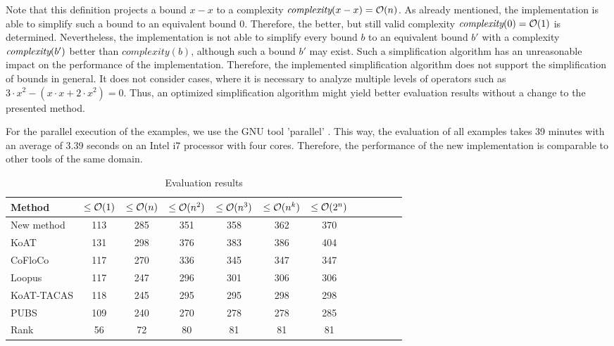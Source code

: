 

Note that this definition projects a bound $x-x$ to a complexity $\emph{complexity}(x-x) = \mathcal{O}(n)$.
As already mentioned, the implementation is able to simplify such a bound to an equivalent bound $0$.
Therefore, the better, but still valid complexity $\emph{complexity}(0) = \mathcal{O}(1)$ is determined.
Nevertheless, the implementation is not able to simplify every bound $b$ to an equivalent bound $b'$ with a complexity $\emph{complexity}(b')$ better than $complexity(b)$, although such a bound $b'$ may exist.
Such a simplification algorithm has an unreasonable impact on the performance of the implementation.
Therefore, the implemented simplification algorithm does not support the simplification of bounds in general.
It does not consider cases, where it is necessary to analyze multiple levels of operators such as $3 \cdot x^2-(x \cdot x+2 \cdot x^2) = 0$.
Thus, an optimized simplification algorithm might yield better evaluation results without a change to the presented method.

For the parallel execution of the examples, we use the GNU tool 'parallel' \cite{gnuparallel}.
This way, the evaluation of all examples takes 39 minutes with an average of 3.39 seconds on an Intel i7 processor with four cores.
Therefore, the performance of the new implementation is comparable to other tools of the same domain.

\begin{table}
  \begin{center}
    \label{tab:evaluation}
    \begin{tabular}{l|c|c|c|c|c|c|c|c|c|c|c}
      Method & $\leq\mathcal{O}(1)$ & $\leq\mathcal{O}(n)$ & $\leq\mathcal{O}(n^2)$ & $\leq\mathcal{O}(n^3)$ & $\leq\mathcal{O}(n^k)$ & $\leq\mathcal{O}(2^n)$\\
      \hline
      New method & 113 & 285 & 351 & 358 & 362 & 370 \\
      KoAT       & 131 & 298 & 376 & 383 & 386 & 404 \\
      CoFloCo    & 117 & 270 & 336 & 345 & 347 & 347 \\
      Loopus     & 117 & 247 & 296 & 301 & 306 & 306 \\
      KoAT-TACAS & 118 & 245 & 295 & 295 & 298 & 298 \\
      PUBS       & 109 & 240 & 270 & 278 & 278 & 285 \\
      Rank       & 56  &  72 &  80 &  81 &  81 &  81 \\
    \end{tabular}
  \end{center}
  \caption{Evaluation results}
\end{table}

